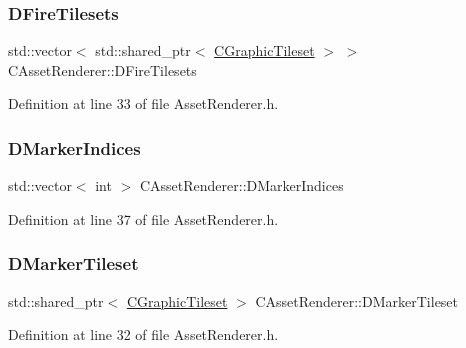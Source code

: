 \subsubsection{\texorpdfstring{D\+Fire\+Tilesets}{DFireTilesets}}
{\footnotesize\ttfamily std\+::vector$<$ std\+::shared\+\_\+ptr$<$ \hyperlink{classCGraphicTileset}{C\+Graphic\+Tileset} $>$ $>$ C\+Asset\+Renderer\+::\+D\+Fire\+Tilesets\hspace{0.3cm}{\ttfamily [protected]}}



Definition at line 33 of file Asset\+Renderer.\+h.

\hypertarget{classCAssetRenderer_a912a2f38f04bc2e5347f972f8f0caa56}{}\label{classCAssetRenderer_a912a2f38f04bc2e5347f972f8f0caa56} 
\subsubsection{\texorpdfstring{D\+Marker\+Indices}{DMarkerIndices}}
{\footnotesize\ttfamily std\+::vector$<$ int $>$ C\+Asset\+Renderer\+::\+D\+Marker\+Indices\hspace{0.3cm}{\ttfamily [protected]}}



Definition at line 37 of file Asset\+Renderer.\+h.

\hypertarget{classCAssetRenderer_afc1e190959f7fd837d6aeb5858cca059}{}\label{classCAssetRenderer_afc1e190959f7fd837d6aeb5858cca059} 
\subsubsection{\texorpdfstring{D\+Marker\+Tileset}{DMarkerTileset}}
{\footnotesize\ttfamily std\+::shared\+\_\+ptr$<$ \hyperlink{classCGraphicTileset}{C\+Graphic\+Tileset} $>$ C\+Asset\+Renderer\+::\+D\+Marker\+Tileset\hspace{0.3cm}{\ttfamily [protected]}}



Definition at line 32 of file Asset\+Renderer.\+h.

\hypertarget{classCAssetRenderer_adfa7285e46e798a7d34a935bc7a6df6c}{}\label{classCAssetRenderer_adfa7285e46e798a7d34a935bc7a6df6c} 
